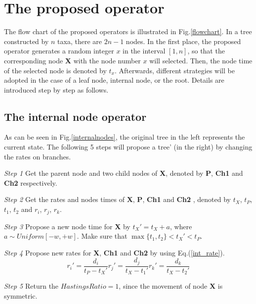 \documentclass{bmcart}
\begin{document}
\section*{The proposed operator}
The flow chart of the proposed operators is illustrated in Fig.\ref{flowchart}. In a tree constructed by $n$ taxa, there are $2n-1$ nodes. In the first place, the proposed operator generates a random integer $x$ in the interval $[1, n]$, so that the corresponding node \textbf{X} with the node number $x$ will selected. Then, the node time of the selected node is denoted by $t_x$. Afterwards, different strategies will be adopted in the case of a leaf node, internal node, or the root. Details are introduced step by step as follows.
\subsection*{The internal node operator}
As can be seen in Fig.\ref{internalnodes}, the original tree in the left represents the current state. The following 5 steps will propose a tree' (in the right) by changing the rates on branches.

\emph{Step 1} Get the parent node and two child nodes of \textbf{X}, denoted by \textbf{P}, \textbf{Ch1} and \textbf{Ch2} respectively.

\emph{Step 2} Get the rates and nodes times of \textbf{X}, \textbf{P}, \textbf{Ch1} and \textbf{Ch2} , denoted by $t_X$, $t_P$, $t_1$, $t_2$ and $r_i$, $r_j$, $r_k$.

\emph{Step 3} Propose a new node time for \textbf{X} by ${t_X}' = {t_X} + a$, where $a \sim Uniform[ - w, + w]$. Make sure that $\max \{ {t_1},{t_2}\}  < {t_X}' < {t_P}$.

\emph{Step 4} Propose new rates for \textbf{X}, \textbf{Ch1} and \textbf{Ch2} by using Eq.(\ref{int_rate}).
\begin{subequations}\label{int_rate}
  \begin{equation}
{r_i}' = \frac{{{d_i}}}{{{t_P} - {t_X}'}}
  \end{equation}
  \begin{equation}
{r_j}' = \frac{{{d_j}}}{{{t_X} - {t_1}'}}
  \end{equation}
  \begin{equation}
{r_k}' = \frac{{{d_k}}}{{{t_X} - {t_2}'}}
\end{equation}
\end{subequations}

\emph{Step 5} Return the $HastingsRatio = 1$, since the movement of node \textbf{X} is symmetric.
\end{document}
